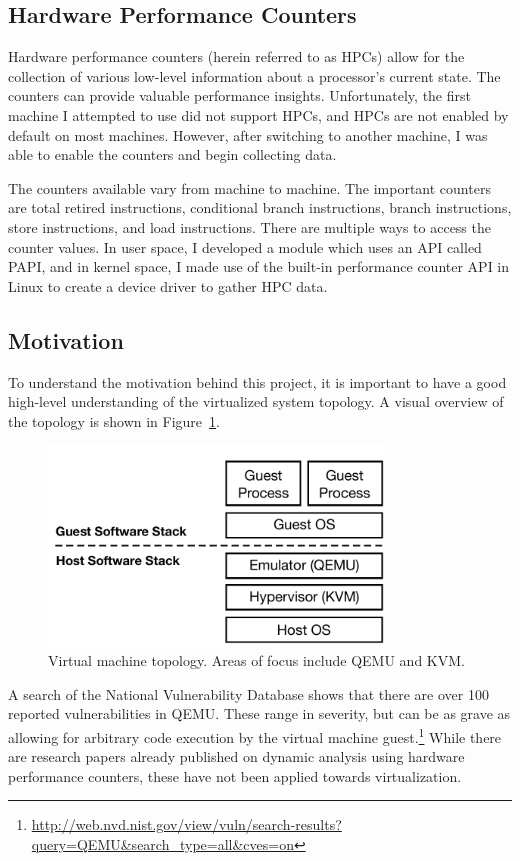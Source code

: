 \documentclass[notitlepage]{article}
\begin{document}
\subsection{Hardware Performance Counters}
Hardware performance counters (herein referred to as HPCs) allow for the
collection of various low-level information about a processor's current state.
The counters can provide valuable performance insights. Unfortunately, the first
machine I attempted to use did not support HPCs, and HPCs are not enabled by
default on most machines.  However, after switching to another machine, I was
able to enable the counters and begin collecting data.

The counters available vary from machine to machine. The important counters are
total retired instructions, conditional branch instructions, branch
instructions, store instructions, and load instructions.  There are multiple
ways to access the counter values. In user space, I developed a module which
uses an API called PAPI\cite{papi}, and in kernel space, I made use of the
built-in performance counter API in Linux to create a device driver to gather
HPC data.

\subsection{Motivation}
To understand the motivation behind this project, it is important to have a good
high-level understanding of the virtualized system topology. A visual overview
of the topology is shown in Figure~\ref{fig:vmtop}.

\begin{figure}[htp]
    \centering
    \includegraphics[width=3.5in]{topology.pdf}
    \caption{Virtual machine topology. Areas of focus include QEMU and KVM.}
    \label{fig:vmtop}
\end{figure}

A search of the National Vulnerability Database shows that there are over
100 reported vulnerabilities in QEMU. These range in severity, but can be as grave
as allowing for arbitrary code execution by the virtual machine
guest.\footnote{\url{http://web.nvd.nist.gov/view/vuln/search-results?query=QEMU&search_type=all&cves=on}}
While there are research papers already published on dynamic analysis using
hardware performance counters, these have not been applied towards
virtualization\cite{numchecker}\cite{feasibility}\cite{pc}.
\end{document}
